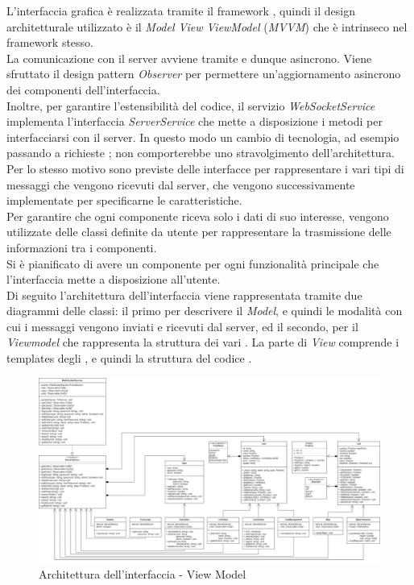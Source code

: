 L'interfaccia grafica è realizzata tramite il framework , quindi il design architetturale utilizzato è il \textit{Model View ViewModel} (\textit{MVVM}) che è intrinseco nel framework stesso. \\
La comunicazione con il server avviene tramite  e dunque asincrono. Viene sfruttato il design pattern \textit{Observer} per permettere un'aggiornamento asincrono dei componenti dell'interfaccia.\\
Inoltre, per garantire l'estensibilità del codice, il servizio \textit{WebSocketService} implementa l'interfaccia \textit{ServerService} che mette a disposizione i metodi per interfacciarsi con il server. In questo modo un cambio di tecnologia, ad esempio passando a richieste ; non comporterebbe uno stravolgimento dell'architettura. \\
Per lo stesso motivo sono previste delle interfacce per rappresentare i vari tipi di messaggi che vengono ricevuti dal server, che vengono successivamente implementate per specificarne le caratteristiche. \\
Per garantire che ogni componente riceva solo i dati di suo interesse, vengono utilizzate delle classi definite da utente per rappresentare la trasmissione delle informazioni tra i componenti. \\
Si è pianificato di avere un componente per ogni funzionalità principale che l'interfaccia mette a disposizione all'utente. \\
\newline
Di seguito l'architettura dell'interfaccia viene rappresentata tramite due diagrammi delle classi: il primo per descrivere il \textit{Model}, e quindi le modalità con cui i messaggi vengono inviati e ricevuti dal server, ed il secondo, per il \textit{Viewmodel} che rappresenta la struttura dei vari . La parte di \textit{View} comprende i templates degli , e quindi la struttura del codice . \\


\newpage

\begin{landscape}
	\begin{figure}[h!]
		\includegraphics[width=24cm]{img/ui component.png}
		\caption{Architettura dell'interfaccia - View Model}
	\end{figure}
\end{landscape}
\newpage

